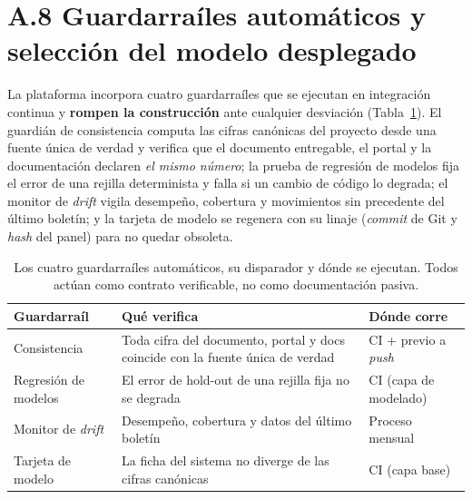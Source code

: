 \documentclass[12pt,letterpaper]{report}
\begin{document}
\section{A.8 Guardarra\'iles autom\'aticos y selecci\'on del modelo desplegado}

La plataforma incorpora cuatro guardarra\'iles que se ejecutan en integraci\'on continua y
\textbf{rompen la construcci\'on} ante cualquier desviaci\'on (Tabla~\ref{tab:guardrails}).
El guardi\'an de consistencia computa las cifras canónicas del proyecto desde una fuente
\'unica de verdad y verifica que el documento entregable, el portal y la documentaci\'on
declaren \textit{el mismo n\'umero}; la prueba de regresi\'on de modelos fija el error de
una rejilla determinista y falla si un cambio de c\'odigo lo degrada; el monitor de
\textit{drift} vigila desempe\~no, cobertura y movimientos sin precedente del \'ultimo
bolet\'in; y la tarjeta de modelo se regenera con su linaje (\textit{commit} de Git y
\textit{hash} del panel) para no quedar obsoleta.

\begin{table}[H]
\centering
\footnotesize
\caption[Guardarra\'iles autom\'aticos]{Los cuatro guardarra\'iles autom\'aticos, su
disparador y d\'onde se ejecutan. Todos act\'uan como contrato verificable, no como
documentaci\'on pasiva.}
\label{tab:guardrails}
\begin{tabular}{@{}p{3.0cm} p{7.8cm} p{2.7cm}@{}}
\toprule
\rowcolor{uacjblue!15}
\textbf{Guardarra\'il} & \textbf{Qu\'e verifica} & \textbf{D\'onde corre} \\ \midrule
Consistencia & Toda cifra del documento, portal y docs coincide con la fuente \'unica de verdad & CI + previo a \textit{push} \\
Regresi\'on de modelos & El error de hold-out de una rejilla fija no se degrada & CI (capa de modelado) \\
Monitor de \textit{drift} & Desempe\~no, cobertura y datos del \'ultimo bolet\'in & Proceso mensual \\
Tarjeta de modelo & La ficha del sistema no diverge de las cifras canónicas & CI (capa base) \\
\bottomrule
\end{tabular}
\end{table}
\end{document}
